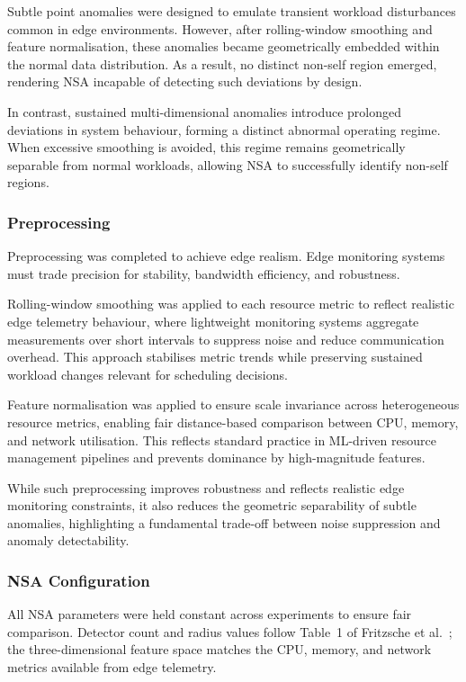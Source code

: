 Subtle point anomalies were designed to emulate transient workload disturbances common in edge environments. However, after rolling-window smoothing and feature normalisation, these anomalies became geometrically embedded within the normal data distribution. As a result, no distinct non-self region emerged, rendering NSA incapable of detecting such deviations by design.

In contrast, sustained multi-dimensional anomalies introduce prolonged deviations in system behaviour, forming a distinct abnormal operating regime. When excessive smoothing is avoided, this regime remains geometrically separable from normal workloads, allowing NSA to successfully identify non-self regions.

\subsubsection{Preprocessing}

Preprocessing was completed to achieve edge realism. Edge monitoring systems must trade precision for stability, bandwidth efficiency, and robustness.

Rolling-window smoothing was applied to each resource metric to reflect realistic edge telemetry behaviour, where lightweight monitoring systems aggregate measurements over short intervals to suppress noise and reduce communication overhead. This approach stabilises metric trends while preserving sustained workload changes relevant for scheduling decisions.

Feature normalisation was applied to ensure scale invariance across heterogeneous resource metrics, enabling fair distance-based comparison between CPU, memory, and network utilisation. This reflects standard practice in ML-driven resource management pipelines and prevents dominance by high-magnitude features.

While such preprocessing improves robustness and reflects realistic edge monitoring constraints, it also reduces the geometric separability of subtle anomalies, highlighting a fundamental trade-off between noise suppression and anomaly detectability.

\subsubsection{NSA Configuration}

All NSA parameters were held constant across experiments to ensure fair comparison. Detector count and radius values follow Table~1 of Fritzsche et al.~\cite{fritzsche2024lightweight}; the three-dimensional feature space matches the CPU, memory, and network metrics available from edge telemetry.

